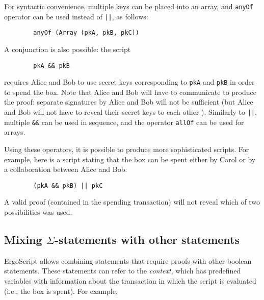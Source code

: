 \documentclass[11pt]{article}
\newcommand{\authnote}[2]{\marginpar{\parbox{\marginparwidth}{\tiny %
  \textsf{#1 {\textcolor{blue}{notes: #2}}}}}%
  \textcolor{blue}{\textbf{\dag}}}
\newcommand{\authnote}[2]{
  \textsf{#1 \textcolor{blue}{: #2}}}
\newcommand{\authnote}[2]{}
\newcommand{\lnote}[1]{{\authnote{\textcolor{orange}{Leo notes}}{#1}}}
\newcommand{\dnote}[1]{{\authnote{\textcolor{brown}{Dima notes}}{#1}}}
\newcommand{\langname}{ErgoScript\xspace}
\begin{document}
For syntactic convenience, multiple keys can be placed into an array, and \texttt{anyOf} operator can be used instead of \texttt{||}, as follows:
\begin{verbatim}
        anyOf (Array (pkA, pkB, pkC))
\end{verbatim}

A conjunction is also possible: the script
\begin{verbatim}
        pkA && pkB
\end{verbatim}
requires Alice and Bob to use secret keys corresponding to \texttt{pkA} and \texttt{pkB} in order to spend the box. Note that Alice and Bob will have to communicate to produce the proof: separate signatures by Alice and Bob will not be sufficient (but Alice and Bob will not have to reveal their secret keys to each other\dnote{concrete procedure of signing such a script might be useful here - what messages in what order Alice and Bob should send to each other in order to generate such a proof correctly?}). Similarly to \texttt{||}, multiple \texttt{\&\&} can be used in sequence, and the operator \texttt{allOf} can be used for arrays.

Using these operators, it is possible to produce more sophisticated scripts. For example, here is a script stating that the box can be spent either by Carol or by a collaboration between Alice and Bob:

\begin{verbatim}
        (pkA && pkB) || pkC
\end{verbatim}

A valid proof (contained in the spending transaction) will not reveal which of two possibilities was used.

\lnote{should probably do a diffie-hellman example here. Do we have a compelling use case? BTW, do all parts of the four-value DH tuple have to be hardwired at compile time, or can some be supplied later, by the context?}

\subsection{Mixing $\Sigma$-statements with other statements}
\langname allows combining statements that require proofs with other boolean statements. These statements can refer to the \emph{context}, which has predefined variables with information about the transaction in which the script is evaluated (i.e., the box is spent). For example,
\end{document}
